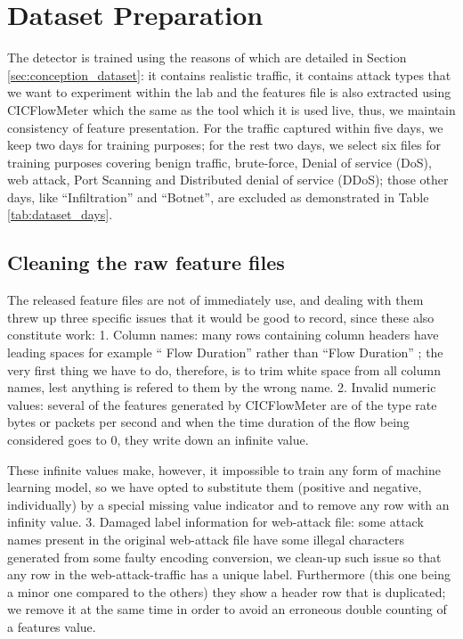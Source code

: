 \section{Dataset Preparation}
\label{sec:results_dataset}

The detector is trained using \cite{sharafaldin2018cicids} the reasons of which are detailed in Section \ref{sec:conception_dataset}: it contains realistic traffic, it contains attack types that we want to experiment within the lab and the features file is also extracted using CICFlowMeter which the same as the tool which it is used live, thus, we maintain consistency of feature presentation. For the traffic captured within five days, we keep two days for training purposes; for the rest two days, we select six files for training purposes covering benign traffic, brute-force, Denial of service (DoS), web attack, Port Scanning and Distributed denial of service (DDoS); those other days, like “Infiltration” and “Botnet”, are excluded as demonstrated in Table \ref{tab:dataset_days}.

\subsection{Cleaning the raw feature files}
\label{sec:results_cleaning}

The released feature files are not of immediately use, and dealing with them threw up three specific issues that it would be good to record, since these also constitute work: 1. Column names: many rows containing column headers have leading spaces  for example “ Flow Duration” rather than “Flow Duration” ; the very first thing we have to do, therefore, is to trim white space from all column names, lest anything is refered to them by the wrong name. 2. Invalid numeric values: several of the features generated by CICFlowMeter are of the type rate bytes or packets per second and when the time duration of the flow being considered goes to 0, they write down an infinite value.

These infinite values make, however, it impossible to train any form of machine learning model, so we have opted to substitute them (positive and negative, individually) by a special missing value indicator and to remove any row with an infinity value. 3. Damaged label information for web-attack file: some attack names present in the original web-attack file have some illegal characters generated from some faulty encoding conversion, we clean-up such issue so that any row in the web-attack-traffic has a unique label. Furthermore (this one being a minor one compared to the others) they show a header row that is duplicated; we remove it at the same time in order to avoid an erroneous double counting of a features value.

